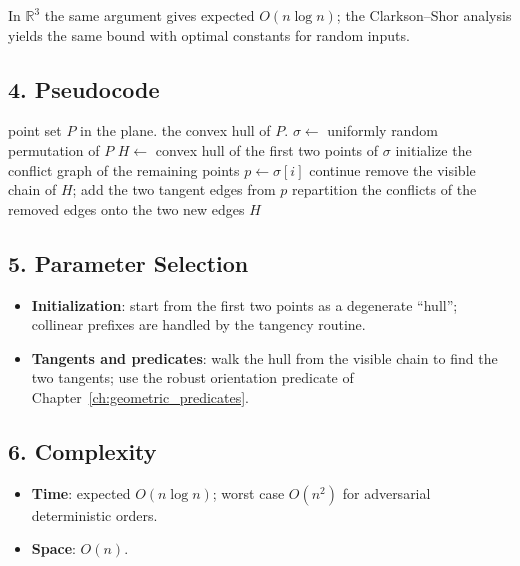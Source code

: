 In $\mathbb{R}^3$ the same argument gives expected $O(n \log n)$; the
Clarkson--Shor analysis \cite{clarkson1989} yields the same bound with optimal
constants for random inputs.

\subsection{4. Pseudocode}

\begin{algorithm}[htbp]
\caption{Randomized Incremental Convex Hull}
\label{alg:rand_convex_hull}
\begin{algorithmic}[1]
\Require point set $P$ in the plane.
\Ensure the convex hull of $P$.
  \State $\sigma \gets$ uniformly random permutation of $P$
  \State $H \gets$ convex hull of the first two points of $\sigma$
  \State initialize the conflict graph of the remaining points
    \State $p \gets \sigma[i]$
     \State continue 
    \Else
      \State remove the visible chain of $H$; add the two tangent edges from $p$
      \State repartition the conflicts of the removed edges onto the two new edges
    \EndIf
  \EndFor
  \State \Return $H$
\EndFunction
\end{algorithmic}
\end{algorithm}

\subsection{5. Parameter Selection}

\begin{itemize}
\item \textbf{Initialization}: start from the first two points as a degenerate
  ``hull''; collinear prefixes are handled by the tangency routine.
\item \textbf{Tangents and predicates}: walk the hull from the visible chain to
  find the two tangents; use the robust orientation predicate of
  Chapter~\ref{ch:geometric_predicates}.
\end{itemize}

\subsection{6. Complexity}

\begin{itemize}
\item \textbf{Time}: expected $O(n \log n)$; worst case $O(n^2)$ for
  adversarial deterministic orders.
\item \textbf{Space}: $O(n)$.
\end{itemize}


